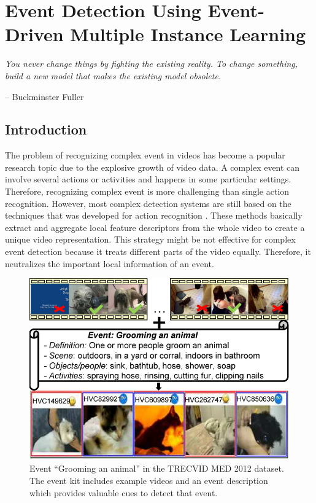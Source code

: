 \chapter{Event Detection Using Event-Driven Multiple Instance Learning}
\label{chapter5}
\epigraph{\textit{You never change things by fighting the existing reality.
		To change something, build a new model that makes the existing model obsolete.}}{ -- Buckminster Fuller}

\ifpdf
    \graphicspath{{Chapter5/Figs/Raster/}{Chapter5/Figs/PDF/}{Chapter5/Figs/}}
\else
    \graphicspath{{Chapter5/Figs/Vector/}{Chapter5/Figs/}}
\fi


\section{Introduction}
The problem of recognizing complex event in videos has become a popular research topic due to the explosive growth of video data. A complex event can involve several actions or activities and happens in some particular settings. Therefore, recognizing complex event is more challenging than single action recognition. However, most complex detection systems are still based on the techniques that was developed for action recognition \cite{oneata2013action,wang2013action}. These methods basically extract and aggregate local feature descriptors from the whole video to create a unique video representation. This strategy might be not effective for complex event detection because it treats different parts of the video equally. Therefore, it neutralizes the important local information of an event.

\begin{figure}
	\centering
	\includegraphics[width=1\textwidth]{figure_1.pdf}
	\caption{Event ``Grooming an animal'' in the TRECVID MED 2012 dataset. The event kit includes example videos and an event description which provides valuable cues to detect that event.}
	\label{figure_1}
\end{figure}

